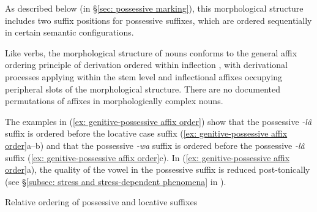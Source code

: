 

As described below (in §\ref{sec: possessive marking}), this morphological structure includes two suffix positions for possessive suffixes, which are ordered sequentially in certain semantic configurations.

Like verbs, the morphological structure of nouns conforms to the general affix ordering principle of derivation ordered within inflection \parencite{bybee1985morphology}, with derivational processes applying within the stem level and inflectional affixes occupying peripheral slots of the morphological structure. There are no documented permutations of affixes in morphologically complex nouns.


The examples in (\ref{ex: genitive-possessive affix order}) show that the possessive \textit{-lâ} suffix is ordered before the locative case suffix (\ref{ex: genitive-possessive affix order}a--b) and that the possessive \textit{-wa} suffix is ordered before the possessive \textit{-lâ} suffix (\ref{ex: genitive-possessive affix order}c). In (\ref{ex: genitive-possessive affix order}a), the quality of the vowel in the possessive suffix is reduced post-tonically (see §\ref{subsec: stress and stress-dependent phenomena} in ).

\ea\label{ex: genitive-possessive affix order}
{Relative ordering of possessive and locative suffixes}

\pagebreak
    \z
\z


